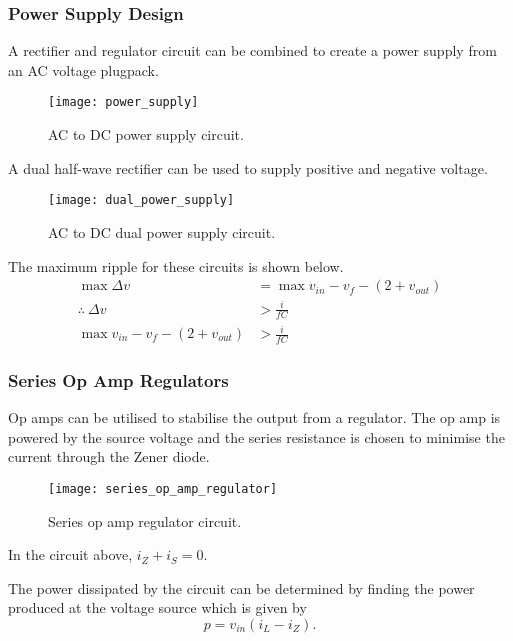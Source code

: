 \documentclass{article}
\begin{document}
\subsubsection{Power Supply Design}
A rectifier and regulator circuit can be combined to create a power supply from an AC voltage plugpack.
\begin{figure}[H]
    \centering
    \texttt{[image: power\_supply]}
    \caption{AC to DC power supply circuit.}
\end{figure}
A dual half-wave rectifier can be used to supply positive and negative voltage.
\begin{figure}[H]
    \centering
    \texttt{[image: dual\_power\_supply]}
    \caption{AC to DC dual power supply circuit.}
\end{figure}
The maximum ripple for these circuits is shown below.
\begin{align*}
    \max{\Delta v}                                  & = \max{v_{in}} - v_f - \left( 2 + v_{out} \right) \\
    \therefore\: \Delta v                           & > \frac{i}{fC}                                    \\
    \max{v_{in}} - v_f - \left( 2 + v_{out} \right) & > \frac{i}{fC}
\end{align*}
\subsubsection{Series Op Amp Regulators}
Op amps can be utilised to stabilise the output from a regulator.
The op amp is powered by the source voltage and the series resistance is chosen to minimise the current through the Zener diode.
\begin{figure}[H]
    \centering
    \texttt{[image: series\_op\_amp\_regulator]}
    \caption{Series op amp regulator circuit.}
\end{figure}
In the circuit above, $i_Z + i_S = 0$.

The power dissipated by the circuit can be determined by finding the power produced at the voltage source
which is given by
\begin{equation*}
    p = v_{in} \left( i_L - i_Z \right).
\end{equation*}
\newpage
\listoffigures
\end{document}
